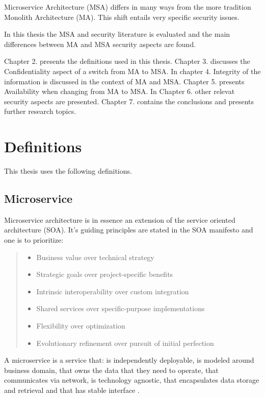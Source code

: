 \begin{sloppypar}
    Microservice Architecture (MSA) differs in many ways from 
    the more tradition Monolith Architecture (MA). This shift entails very specific security issues.

    In this thesis the MSA and security literature is evaluated and the main differences between
    MA and MSA security aspects are found.

    Chapter 2. presents the definitions used in this thesis. 
    Chapter 3. discusses the Confidentiality aspect of a switch from MA to MSA. 
    In chapter 4. Integrity of the information is discussed in the context of MA and MSA. 
    Chapter 5. presents Availability when changing from MA to MSA.
    In Chapter 6. other relevat security aspects are presented.
    Chapter 7. contains the conclusions and presents further research topics.
\end{sloppypar}


\section{Definitions}
\begin{sloppypar}
    This thesis uses the following definitions.
\end{sloppypar}



\subsection{Microservice}
\begin{sloppypar}

    Microservice architecture is in essence an extension of the
    service oriented architecture (SOA). It's guiding principles are stated in the 
    SOA manifesto \citep{soamanifesto} and one is to prioritize:
    \begin{quotation}
        \noindent \it
        \begin{itemize}
            \item Business value over technical strategy
            \item Strategic goals over project-specific benefits 
            \item Intrinsic interoperability over custom integration 
            \item Shared services over specific-purpose implementations 
            \item Flexibility over optimization 
            \item Evolutionary refinement over pursuit of initial perfection
        \end{itemize}
    \end{quotation}

    A microservice is a service that: is independently deployable,
    is modeled around business domain,
    that owns the data that they need to operate,
    that communicates via network,
    is technology agnostic,
    that encapsulates data storage and retrieval and 
    that has stable interface \citep{newman2019}.
\end{sloppypar}

